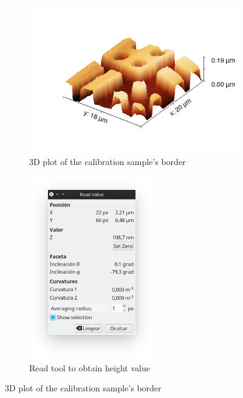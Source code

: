 \documentclass[11pt,a4paper]{article}
\begin{document}
\begin{figure}[H]
\centering
\begin{subfigure}[b]{0.45\textwidth}
\includegraphics[scale=0.47]{sm_border_3D}
\caption{3D plot of the calibration sample's border}
\label{fig: cal sam border}
\end{subfigure}
\begin{subfigure}[b]{0.45\textwidth}
\centering
\includegraphics[width=0.6\textwidth]{static_mode_read_value_height}
\caption{Read tool to obtain height value}
\label{fig:read_tool}
\end{subfigure}
\caption{3D plot of the calibration sample's border}
\label{fig:3d_and_read_value}
\end{figure}
\end{document}
